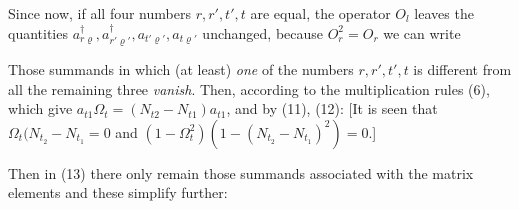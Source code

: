 \begin{paper}{1}
Since now, if all four numbers $r,r',t',t$ are equal, the operator $O_l$ leaves the quantities $a_{r\varrho}^\dagger,a_{r'\varrho'}^\dagger,a_{t'\varrho'},a_{t\varrho'}$ unchanged, because $O_r^2=O_r$ we can write

Those summands in which (at least) \textit{one} of the numbers $r,r',t',t$ is different from all the remaining three \textit{vanish}. Then, according to the multiplication rules (6), which give $a_{t1}\Omega_t = (N_{t2} - N_{t1})a_{t1}$, and by (11), (12):
[It is seen that $\Omega_t(N_{t_2}-N_{t_1}=0$ and $(1-\Omega_t^2)\left(1-(N_{t_2}-N_{t_1})^2\right)=0$.]

Then in (13) there only remain those summands associated with the matrix elements
and these simplify further:


\end{paper}
